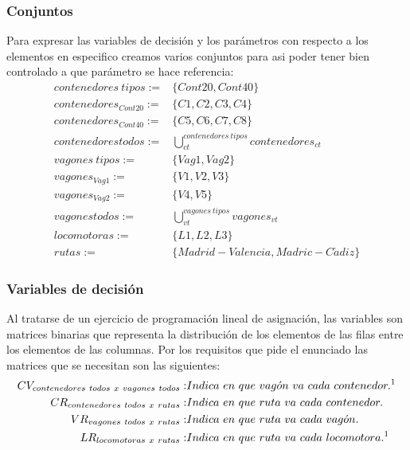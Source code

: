 \documentclass[11pt,spanish]{article}
\begin{document}
			\subsubsection{Conjuntos}
			Para expresar las variables de decisión y los parámetros con respecto a los elementos en especifico creamos varios conjuntos para asi poder tener bien controlado a que parámetro se hace referencia:
			\begin{align*}
				contenedores\ tipos :=& \{ Cont20, Cont40 \} \\
				contenedores_{Cont20} :=& \{ C1, C2, C3, C4 \} \\
				contenedores_{Cont40} :=& \{ C5, C6, C7, C8 \} \\
				contenedores todos :=& \bigcup_{ct}^{contenedores\ tipos} contenedores_{ct} \\
				vagones\ tipos :=& \{ Vag1, Vag2 \} \\
				vagones_{Vag1} :=& \{ V1, V2, V3 \} \\
				vagones_{Vag2} :=& \{ V4, V5 \} \\
				vagones todos :=& \bigcup_{vt}^{vagones\ tipos} vagones_{vt} \\
				locomotoras :=& \{ L1, L2, L3 \} \\
				rutas :=& \{ Madrid-Valencia, Madric-C\acute{a}diz \}
			\end{align*}
			\subsubsection{Variables de decisión}
			Al tratarse de un ejercicio de programación lineal de asignación, las variables son matrices binarias que representa la distribución de los elementos de las filas entre los elementos de las columnas. Por los requisitos que pide el enunciado las matrices que se necesitan son las siguientes:
			\begin{align*}
				CV_{contenedores\ todos\ x\ vagones\ todos} :& Indica\ en\ que\ vag\acute{o}n\ va\ cada\ contenedor.\text{\footnotemark} \\
				CR_{contenedores\ todos\ x\ rutas} :& Indica\ en\ que\ ruta\ va\ cada\ contenedor.\\
				VR_{vagones\ todos\ x\ rutas} :& Indica\ en\ que\ ruta\ va\ cada\ vag\acute{o}n.\\
				LR_{locomotoras\ x\ rutas} :& Indica\ en\ que\ ruta\ va\ cada\ locomotora.^1
			\end{align*}
\end{document}
